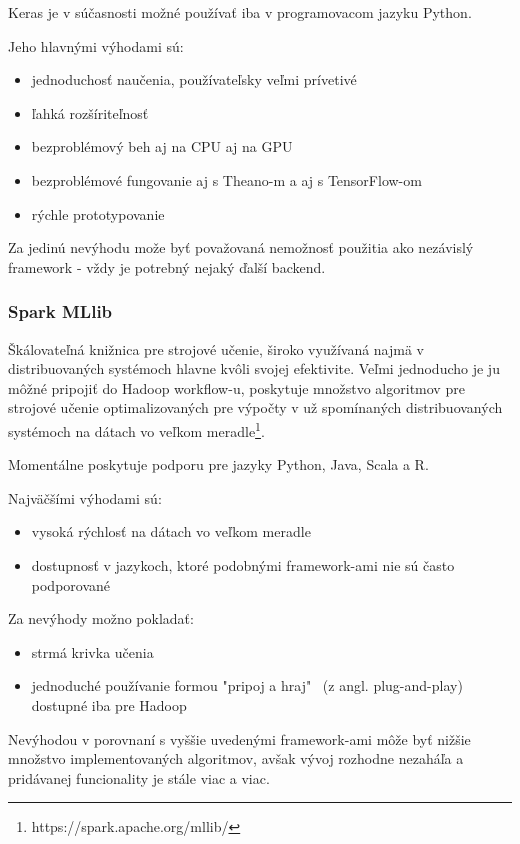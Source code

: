 Keras je v súčasnosti možné používať iba v programovacom jazyku Python.

Jeho hlavnými výhodami sú:
\begin{itemize}
	\item jednoduchosť naučenia, používateľsky veľmi prívetivé
	\item ľahká rozšíriteľnosť
	\item bezproblémový beh aj na CPU aj na GPU
	\item bezproblémové fungovanie aj s Theano-m a aj s TensorFlow-om
	\item rýchle prototypovanie
\end{itemize}

Za jedinú nevýhodu može byť považovaná nemožnosť použitia ako nezávislý framework - vždy je potrebný nejaký ďalší backend.

\subsubsection{Spark MLlib}

Škálovateľná knižnica pre strojové učenie, široko využívaná najmä v distribuovaných systémoch hlavne kvôli svojej efektivite. Veľmi jednoducho je ju môžné pripojiť do Hadoop workflow-u, poskytuje množstvo algoritmov pre strojové učenie optimalizovaných pre výpočty v už spomínaných distribuovaných systémoch na dátach vo veľkom meradle\footnote{https://spark.apache.org/mllib/}.

Momentálne poskytuje podporu pre jazyky Python, Java, Scala a R.

Najväčšími výhodami sú:
\begin{itemize}
	\item vysoká rýchlosť na dátach vo veľkom meradle
	\item dostupnosť v jazykoch, ktoré podobnými framework-ami nie sú často podporované
\end{itemize}

Za nevýhody možno pokladať:
\begin{itemize}
	\item strmá krivka učenia
	\item jednoduché používanie formou "pripoj a hraj" \ (z angl. plug-and-play) dostupné iba pre Hadoop
\end{itemize}

Nevýhodou v porovnaní s vyššie uvedenými framework-ami môže byť nižšie množstvo implementovaných algoritmov, avšak vývoj rozhodne nezaháľa a pridávanej funcionality je stále viac a viac.

